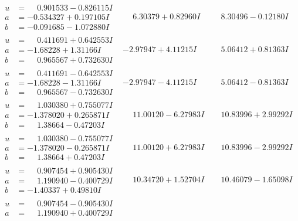 \documentclass[1p]{elsarticle_modified}
\theoremstyle{definition}
\begin{document}
$$\begin{array}{c|c|c}
\begin{aligned}
u &= \phantom{-}0.901533 - 0.826115 I \\
a &= -0.534327 + 0.197105 I \\
b &= -0.091685 - 1.072880 I\end{aligned}
 & \phantom{-}6.30379 + 0.82960 I & \phantom{-}8.30496 - 0.12180 I \\ \hline\begin{aligned}
u &= \phantom{-}0.411691 + 0.642553 I \\
a &= -1.68228 + 1.31166 I \\
b &= \phantom{-}0.965567 + 0.732630 I\end{aligned}
 & -2.97947 + 4.11215 I & \phantom{-}5.06412 + 0.81363 I \\ \hline\begin{aligned}
u &= \phantom{-}0.411691 - 0.642553 I \\
a &= -1.68228 - 1.31166 I \\
b &= \phantom{-}0.965567 - 0.732630 I\end{aligned}
 & -2.97947 - 4.11215 I & \phantom{-}5.06412 - 0.81363 I \\ \hline\begin{aligned}
u &= \phantom{-}1.030380 + 0.755077 I \\
a &= -1.378020 + 0.265871 I \\
b &= \phantom{-}1.38664 - 0.47203 I\end{aligned}
 & \phantom{-}11.00120 - 6.27983 I & \phantom{-}10.83996 + 2.99292 I \\ \hline\begin{aligned}
u &= \phantom{-}1.030380 - 0.755077 I \\
a &= -1.378020 - 0.265871 I \\
b &= \phantom{-}1.38664 + 0.47203 I\end{aligned}
 & \phantom{-}11.00120 + 6.27983 I & \phantom{-}10.83996 - 2.99292 I \\ \hline\begin{aligned}
u &= \phantom{-}0.907454 + 0.905430 I \\
a &= \phantom{-}1.190940 - 0.400729 I \\
b &= -1.40337 + 0.49810 I\end{aligned}
 & \phantom{-}10.34720 + 1.52704 I & \phantom{-}10.46079 - 1.65098 I \\ \hline\begin{aligned}
u &= \phantom{-}0.907454 - 0.905430 I \\
a &= \phantom{-}1.190940 + 0.400729 I \\

\end{aligned}
\end{array}$$
\end{document}
